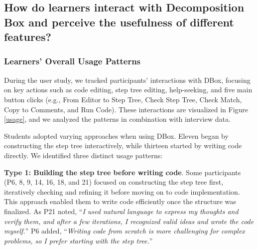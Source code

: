 



\subsection{How do learners interact with Decomposition Box and perceive the usefulness of different features?}
\label{actual_use}

\subsubsection{Learners' Overall Usage Patterns}

During the user study, we tracked participants' interactions with DBox, focusing on key actions such as code editing, step tree editing, help-seeking, and five main button clicks (e.g., From Editor to Step Tree, Check Step Tree, Check Match, Copy to Comments, and Run Code). These interactions are visualized in Figure \ref{usage}, and we analyzed the patterns in combination with interview data.

Students adopted varying approaches when using DBox. Eleven began by constructing the step tree interactively, while thirteen started by writing code directly. We identified three distinct usage patterns:

\colorbox{color2}{\textbf{Type 1: Building the step tree before writing code}.} Some participants (P6, 8, 9, 14, 16, 18, and 21) focused on constructing the step tree first, iteratively checking and refining it before moving on to code implementation. This approach enabled them to write code efficiently once the structure was finalized. As P21 noted, ``\emph{I used natural language to express my thoughts and verify them, and after a few iterations, I recognized valid ideas and wrote the code myself.}'' P6 added, ``\emph{Writing code from scratch is more challenging for complex problems, so I prefer starting with the step tree.}''

